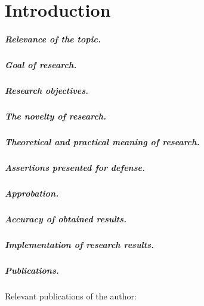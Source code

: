\chapter*{Introduction}                         %


\paragraph*{Relevance of the topic.}
\paragraph*{Goal of research.}
\paragraph*{Research objectives.}
\paragraph*{The novelty of research.}
\paragraph*{Theoretical and practical meaning of research.}
\paragraph*{Assertions presented for defense.}

\paragraph*{Approbation.}
\paragraph*{Accuracy of obtained results.}
\paragraph*{Implementation of research results.}
\paragraph*{Publications.}
Relevant publications of the author:


